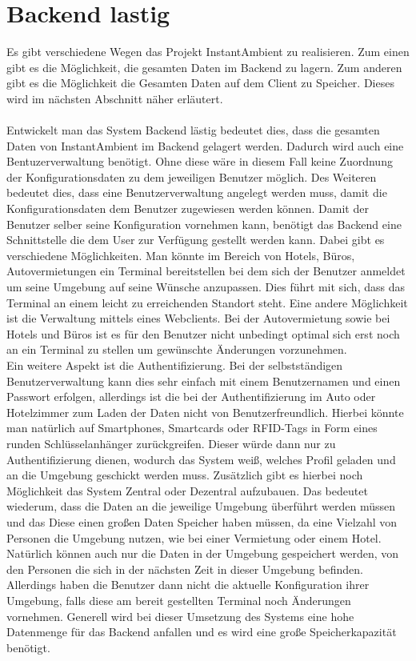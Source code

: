 \section{Backend lastig}
Es gibt verschiedene Wegen das Projekt InstantAmbient zu realisieren. Zum einen gibt es die Möglichkeit, die gesamten Daten im Backend zu lagern. 
Zum anderen gibt es die Möglichkeit die Gesamten Daten auf dem Client zu Speicher. Dieses wird im nächsten Abschnitt näher erläutert.
\\\\
Entwickelt man das System Backend lästig bedeutet dies, dass die gesamten Daten von InstantAmbient im Backend gelagert werden. 
Dadurch wird auch eine Bentuzerverwaltung benötigt. Ohne diese wäre in diesem Fall keine Zuordnung der Konfigurationsdaten zu dem jeweiligen Benutzer möglich. 
Des Weiteren bedeutet dies, dass eine Benutzerverwaltung angelegt werden muss, damit die Konfigurationsdaten dem Benutzer zugewiesen werden können. 
Damit der Benutzer selber seine Konfiguration vornehmen kann, benötigt das Backend eine Schnittstelle die dem User zur Verfügung gestellt werden kann. 
Dabei gibt es verschiedene Möglichkeiten. Man könnte im Bereich von Hotels, Büros, Autovermietungen ein Terminal bereitstellen bei dem sich der Benutzer anmeldet 
um seine Umgebung auf seine Wünsche anzupassen. Dies führt mit sich, dass das Terminal an einem leicht zu erreichenden Standort steht. Eine andere Möglichkeit ist 
die Verwaltung mittels eines Webclients. Bei der Autovermietung sowie bei Hotels und Büros ist es für den Benutzer nicht unbedingt optimal sich erst noch an 
ein Terminal zu stellen um gewünschte Änderungen vorzunehmen. \\
Ein weitere Aspekt ist die Authentifizierung. Bei der selbstständigen Benutzerverwaltung kann dies sehr einfach mit einem Benutzernamen und einen Passwort erfolgen, 
allerdings ist die bei der Authentifizierung im Auto oder Hotelzimmer zum Laden der Daten nicht von Benutzerfreundlich. Hierbei könnte man natürlich auf Smartphones, 
Smartcards oder RFID-Tags in Form eines runden Schlüsselanhänger zurückgreifen. Dieser würde dann nur zu Authentifizierung dienen, wodurch das System weiß, welches Profil geladen und an die Umgebung geschickt werden muss. Zusätzlich gibt es hierbei noch Möglichkeit das System Zentral oder Dezentral aufzubauen. Das bedeutet wiederum, dass die Daten an die jeweilige Umgebung überführt werden müssen und das Diese einen großen Daten Speicher haben müssen, da eine Vielzahl von Personen die Umgebung nutzen, wie bei einer Vermietung oder einem Hotel. Natürlich können auch nur die Daten in der Umgebung gespeichert werden, von den Personen die sich in der nächsten Zeit in dieser Umgebung befinden. Allerdings haben die Benutzer dann nicht die aktuelle Konfiguration ihrer Umgebung, falls diese am bereit gestellten Terminal noch Änderungen vornehmen.  
Generell wird bei dieser Umsetzung des Systems eine hohe Datenmenge für das Backend anfallen und es wird eine große Speicherkapazität benötigt.

